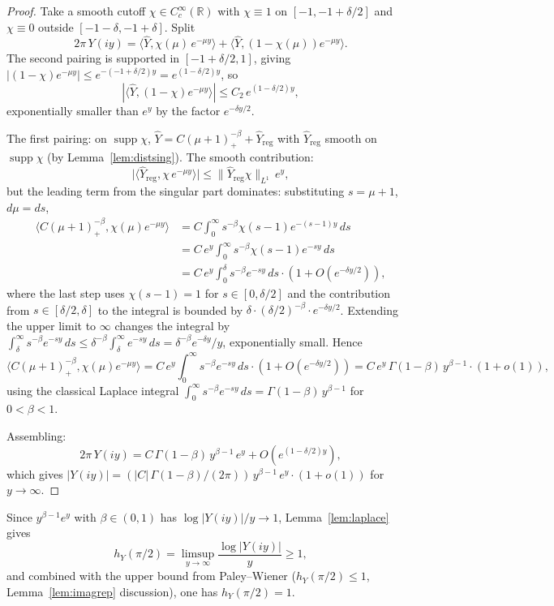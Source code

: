 \documentclass[11pt,a4paper]{article}
\theoremstyle{plain}
\theoremstyle{definition}
\newcommand{\R}{\mathbb{R}}
\DeclareMathOperator{\supp}{supp}
\begin{document}
\begin{proof}
Take a smooth cutoff $\chi\in C_c^\infty(\R)$ with $\chi\equiv 1$ on $[-1,-1+\delta/2]$ and $\chi\equiv 0$ outside $[-1-\delta,-1+\delta]$. Split
\[
2\pi\,Y(iy)=\langle\hat Y,\chi(\mu)\,e^{-\mu y}\rangle+\langle\hat Y,(1-\chi(\mu))e^{-\mu y}\rangle.
\]
The second pairing is supported in $[-1+\delta/2,1]$, giving $|(1-\chi)e^{-\mu y}|\le e^{-(-1+\delta/2)y}=e^{(1-\delta/2)y}$, so
\[
|\langle\hat Y,(1-\chi)e^{-\mu y}\rangle|\le C_2\,e^{(1-\delta/2)y},
\]
exponentially smaller than $e^y$ by the factor $e^{-\delta y/2}$.

The first pairing: on $\supp\chi$, $\hat Y=C(\mu+1)_+^{-\beta}+\hat Y_{\text{reg}}$ with $\hat Y_{\text{reg}}$ smooth on $\supp\chi$ (by Lemma~\ref{lem:distsing}). The smooth contribution:
\[
\big|\langle\hat Y_{\text{reg}},\chi\,e^{-\mu y}\rangle\big|\le\|\hat Y_{\text{reg}}\chi\|_{L^1}\,e^y,
\]
but the leading term from the singular part dominates: substituting $s=\mu+1$, $d\mu=ds$,
\begin{align*}
\langle C(\mu+1)_+^{-\beta},\chi(\mu)e^{-\mu y}\rangle
&=C\int_0^\infty s^{-\beta}\chi(s-1)e^{-(s-1)y}\,ds\\
&=C\,e^y\int_0^\infty s^{-\beta}\chi(s-1)e^{-sy}\,ds\\
&=C\,e^y\int_0^{\delta}s^{-\beta}e^{-sy}\,ds\cdot(1+O(e^{-\delta y/2})),
\end{align*}
where the last step uses $\chi(s-1)=1$ for $s\in[0,\delta/2]$ and the contribution from $s\in[\delta/2,\delta]$ to the integral is bounded by $\delta\cdot(\delta/2)^{-\beta}\cdot e^{-\delta y/2}$. Extending the upper limit to $\infty$ changes the integral by $\int_\delta^\infty s^{-\beta}e^{-sy}\,ds\le\delta^{-\beta}\int_\delta^\infty e^{-sy}\,ds=\delta^{-\beta}e^{-\delta y}/y$, exponentially small. Hence
\[
\langle C(\mu+1)_+^{-\beta},\chi(\mu)e^{-\mu y}\rangle=C\,e^y\int_0^\infty s^{-\beta}e^{-sy}\,ds\cdot(1+O(e^{-\delta y/2}))=C\,e^y\,\Gamma(1-\beta)\,y^{\beta-1}\cdot(1+o(1)),
\]
using the classical Laplace integral $\int_0^\infty s^{-\beta}e^{-sy}\,ds=\Gamma(1-\beta)\,y^{\beta-1}$ for $0<\beta<1$.

Assembling:
\[
2\pi\,Y(iy)=C\,\Gamma(1-\beta)\,y^{\beta-1}\,e^y+O(e^{(1-\delta/2)y}),
\]
which gives $|Y(iy)|=(|C|\,\Gamma(1-\beta)/(2\pi))\,y^{\beta-1}\,e^y\cdot(1+o(1))$ for $y\to\infty$.
\end{proof}

Since $y^{\beta-1}e^y$ with $\beta\in(0,1)$ has $\log|Y(iy)|/y\to 1$, Lemma~\ref{lem:laplace} gives
\[
h_Y(\pi/2)=\limsup_{y\to\infty}\frac{\log|Y(iy)|}{y}\ge 1,
\]
and combined with the upper bound from Paley--Wiener ($h_Y(\pi/2)\le 1$, Lemma~\ref{lem:imagrep} discussion), one has $h_Y(\pi/2)=1$.
\end{document}
